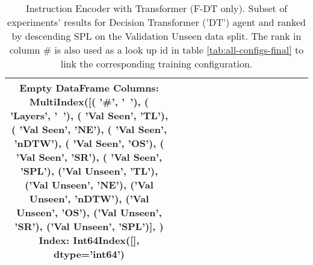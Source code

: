 \begin{table}
\centering
\caption{\label{tab:dt_instruction_encoding_full}Instruction Encoder with Transformer (F-DT only). Subset of experiments' results for Decision Transformer ('DT') agent and ranked by descending SPL on the Validation Unseen data split. The rank in column \# is also used as a look up id in table \ref{tab:all-configs-final} to link the corresponding training configuration.}
\begin{tabular}{@{\hskip3pt}c@{\hskip3pt}c@{\hskip3pt}c@{\hskip3pt}c@{\hskip3pt}c@{\hskip3pt}c@{\hskip3pt}c@{\hskip3pt}c@{\hskip3pt}c@{\hskip3pt}c@{\hskip3pt}c@{\hskip3pt}c@{\hskip3pt}c@{\hskip3pt}c@{\hskip3pt}c}
\toprule
Empty DataFrame
Columns: MultiIndex([(        '\textbf{\#}',    '\textbf{~}'),
            (    '\textbf{Layers}',    '\textbf{~}'),
            (  '\textbf{Val Seen}',   '\textbf{TL}'),
            (  '\textbf{Val Seen}',   '\textbf{NE}'),
            (  '\textbf{Val Seen}', '\textbf{nDTW}'),
            (  '\textbf{Val Seen}',   '\textbf{OS}'),
            (  '\textbf{Val Seen}',   '\textbf{SR}'),
            (  '\textbf{Val Seen}',  '\textbf{SPL}'),
            ('\textbf{Val Unseen}',   '\textbf{TL}'),
            ('\textbf{Val Unseen}',   '\textbf{NE}'),
            ('\textbf{Val Unseen}', '\textbf{nDTW}'),
            ('\textbf{Val Unseen}',   '\textbf{OS}'),
            ('\textbf{Val Unseen}',   '\textbf{SR}'),
            ('\textbf{Val Unseen}',  '\textbf{SPL}')],
           )
Index: Int64Index([], dtype='int64') \\
\bottomrule
\end{tabular}
\end{table}

